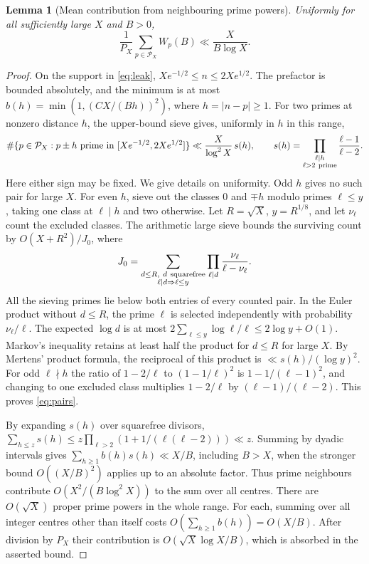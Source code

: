 \documentclass[11pt]{article}
\newtheorem{lemma}[theorem]{Lemma}
\newcommand{\calP}{\mathcal P}\newcommand{\wh}{\widehat}
\begin{document}
\begin{lemma}[Mean contribution from neighbouring prime powers]\label{lem:sieve}
Uniformly for all sufficiently large $X$ and $B>0$,
\[
 \frac1{P_X}\sum_{p\in\calP_X} W_p(B)\ll\frac{X}{B\log X}.
\]
\end{lemma}
\begin{proof}
On the support in \eqref{eq:leak}, $X e^{-1/2}\le n\le 2Xe^{1/2}$.
The prefactor is bounded absolutely, and the minimum is at most
$b(h)=\min(1,(C X/(Bh))^2)$, where $h=|n-p|\ge1$.
For two primes at nonzero distance $h$, the upper-bound sieve gives,
uniformly in $h$ in this range,
\begin{equation}\label{eq:pairs}
 \#\{p\in\calP_X:p\pm h\text{ prime in }[Xe^{-1/2},2Xe^{1/2}]\}
 \ll \frac{X}{\log^2X}\,s(h),\qquad
 s(h)=\prod_{\substack{\ell\mid h\\\ell>2\ {\rm prime}}}
       \frac{\ell-1}{\ell-2}.
\end{equation}
Here either sign may be fixed. We give details on uniformity. Odd $h$ gives
no such pair for large $X$. For even $h$, sieve out the classes $0$ and
$\mp h$ modulo primes $\ell\le y$, taking one class at $\ell\mid h$ and
two otherwise. Let $R=\sqrt X$, $y=R^{1/8}$, and let $\nu_\ell$ count the
excluded classes. The arithmetic large sieve
\cite[Corollary 1]{mv} bounds the surviving count by $O(X+R^2)/J_0$,
where
\[
 J_0=\sum_{\substack{d\le R,\ d\ {\rm squarefree}\\
                         \ell\mid d\Rightarrow\ell\le y}}
                 \prod_{\ell\mid d}\frac{\nu_\ell}{\ell-\nu_\ell}.
\]
All the sieving primes lie below both entries of every counted pair.
In the Euler product without $d\le R$, the prime $\ell$ is selected
independently with probability $\nu_\ell/\ell$. The expected $\log d$ is
at most $2\sum_{\ell\le y}\log\ell/\ell\le 2\log y+O(1)$.
Markov's inequality retains at least half the product for $d\le R$ for
large $X$. By Mertens' product formula, the reciprocal of this product
is $\ll s(h)/(\log y)^2$. For odd $\ell\nmid h$ the ratio of
$1-2/\ell$ to $(1-1/\ell)^2$ is $1-1/(\ell-1)^2$, and changing to
one excluded class multiplies $1-2/\ell$ by $(\ell-1)/(\ell-2)$.
This proves \eqref{eq:pairs}.

By expanding $s(h)$ over squarefree divisors,
$\sum_{h\le z}s(h)\le z\prod_{\ell>2}(1+1/(\ell(\ell-2)))\ll z$.
Summing by dyadic intervals gives
$\sum_{h\ge1}b(h)s(h)\ll X/B$, including $B>X$, when the stronger
bound $O((X/B)^2)$ applies up to an absolute factor. Thus prime
neighbours contribute $O(X^2/(B\log^2X))$ to the sum over all centres.
There are $O(\sqrt X)$ proper prime powers in the whole range.
For each, summing over all integer centres other than itself costs
$O(\sum_{h\ge1}b(h))=O(X/B)$. After division by $P_X$ their contribution
is $O(\sqrt X\log X/B)$, which is absorbed in the asserted bound.
\end{proof}
\end{document}
